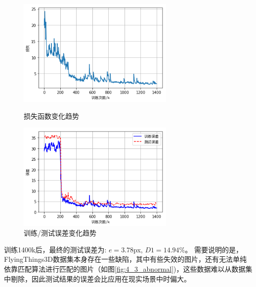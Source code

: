 
\begin{figure}[htbp]
	\centering
	\begin{minipage}[c]{0.48\textwidth}
		\centering
		\includegraphics[width=3in]{figures/4_3_ft3d_loss}
		\caption{损失函数变化趋势}\label{fig:4_3_ft3d_loss}
	\end{minipage}
	\hfill
	\begin{minipage}[c]{0.48\textwidth}
		\centering
		\includegraphics[width=3in]{figures/4_3_ft3d_error}
		\caption{训练/测试误差变化趋势}\label{fig:4_3_ft3d_error}
	\end{minipage}
\end{figure}

训练1400k后，最终的测试误差为: $e = 3.78$px, $D1 = 14.94\%$。
需要说明的是，FlyingThings3D数据集本身存在一些缺陷，其中有些失效的图片，还有无法单纯依靠匹配算法进行匹配的图片（如图\ref{fig:4_3_abnormal})，这些数据难以从数据集中剔除，因此测试结果的误差会比应用在现实场景中时偏大。

